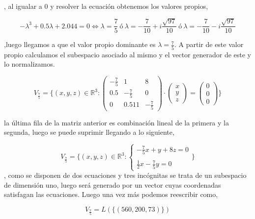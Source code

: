 \documentclass{article}
\begin{document}
, al igualar a 0 y resolver la ecuación obtenemos los valores propios,

\begin{equation*}
-\lambda^3+0.5\lambda+2.044 = 0 \Leftrightarrow \lambda = \frac{7}{5} \> ó \> \lambda = -\frac{7}{10}+i\frac{\sqrt{97}}{10} \> ó \> \lambda = -\frac{7}{10}-i\frac{\sqrt{97}}{10}
\end{equation*}

,luego llegamos a que el valor propio dominante es $\lambda = \frac{7}{5}$. A partir de este valor propio calculamos el subespacio asociado al mismo y el vector generador de este y lo normalizamos.

\begin{equation*}
V_{\frac{7}{5}}=\{(x,y,z)\in \mathbb{R}^3 : 
\begin{pmatrix}
-\frac{7}{5} & 1 & 8 \\
0.5 & -\frac{7}{5} & 0 \\
0 & 0.511 & -\frac{7}{5}
\end{pmatrix}
\cdot
\begin{pmatrix}
x \\
y \\
z 
\end{pmatrix}
=
\begin{pmatrix}
0 \\
0 \\ 
0
\end{pmatrix}
\}
\end{equation*}

la última fila de la matriz anterior es combinación lineal de la primera y la segunda, luego se puede suprimir llegando a lo siguiente,

\begin{equation*}
V_{\frac{7}{5}}=\{(x,y,z)\in \mathbb{R}^3: \left\{ \begin{array}{lcc}
             -\frac{7}{5}x+y+8z=0\\
             \\ \frac{1}{2}x-\frac{7}{5}y = 0
             \end{array}
   \right. \}
\end{equation*}
, como se disponen de dos ecuaciones y tres incógnitas se trata de un subespacio de dimensión uno, luego será generado por un vector cuyas coordenadas satisfagan las ecuaciones. Luego una vez más podemos reescribir como,

\begin{equation*}
V_{\frac{7}{5}}=L(\{(560,200,73)\})
\end{equation*}
\end{document}
